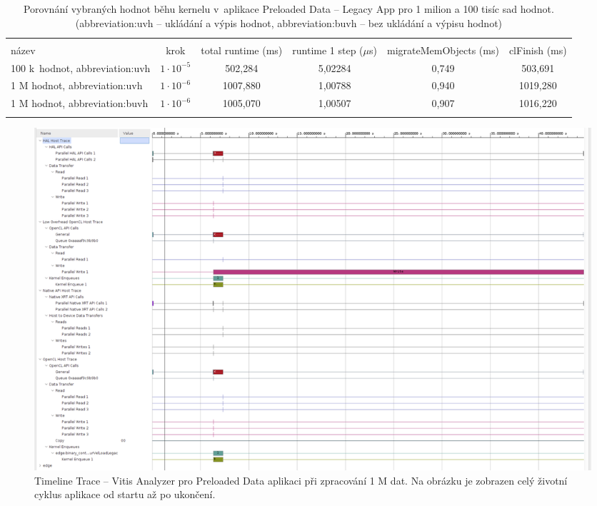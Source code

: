 \documentclass[a4paper, twoside, 11pt]{article}
\begin{document}
		\begin{table}[H]
		\centering
		\caption{Porovnání vybraných hodnot běhu kernelu v~aplikace Preloaded Data – Legacy App pro 1 milion a 100 tisíc sad hodnot. (\gls{abbreviation:uvh} – ukládání a výpis hodnot, \gls{abbreviation:buvh} – bez ukládání a výpisu hodnot)}
		\vspace*{0.15cm}
		\resizebox{\textwidth}{!}
		{
		\begin{tabular}{!{\vrule width 2pt} l | c | c | c | c | c !{\vrule width 2pt}}
		\\
		název & krok & total runtime (ms) & runtime 1 step ($\mu$s) & migrateMemObjects (ms) & clFinish (ms)\\
		100 k~hodnot, \gls{abbreviation:uvh} & $1\cdot 10^{-5}$ & 502,284 & 5,02284 & 0,749 & 503,691\\  M hodnot, \gls{abbreviation:uvh} & $1\cdot 10^{-6}$ & 1007,880 & 1,00788 & 0,940 & 1019,280 \\  M hodnot, \gls{abbreviation:buvh} & $1\cdot 10^{-6}$ & 1005,070 & 1,00507 & 0,907 & 1016,220\\
			\end{tabular}
		}
			\label{tab:porovnani-vybranych-hodnot-behu-kernelu-pro-1M-100k-sad-hodnot}
	\end{table}

	\begin{figure}[htbp!]
		\centering
		\includegraphics[width=1\textwidth]{src/png/vitis-analyzer/legacy-rt/1M-data/writing-data-output/legacy-rt-step-0.000001-timeline-trace-zoom-out.png}
		\caption{Timeline Trace – Vitis Analyzer pro Preloaded Data aplikaci při zpracování 1 M dat. Na obrázku je zobrazen celý životní cyklus aplikace od startu až po ukončení.}
		\label{fig:legacy-rt-step-0.000001-timeline-trace-zoom-out}
	\end{figure}
\end{document}
